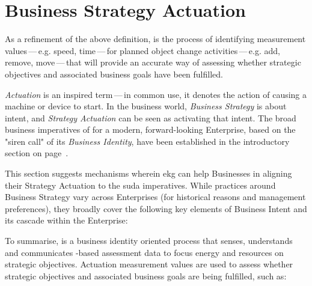 \chapter{Business Strategy Actuation}
\label{ch:ekg-mm-a-1}
\label{ch:ekg-mm-business-strategy-actuation}



As a refinement of the above definition, \textbf{} is the process of
identifying measurement values\,---\,e.g. speed, time\,---\,for planned object change activities\,---\,e.g.
add, remove, move\,---\,that will provide an accurate way of assessing whether strategic objectives and
associated business goals have been fulfilled.

\textit{Actuation} is an inspired term\,---\,in common use, it denotes the action of causing a
machine or device to start.
In the business world, \textit{Business Strategy} is about intent, and \textit{Strategy Actuation}
can be seen as activating that intent.
The broad business imperatives of  for a modern, forward-looking Enterprise,
based on the "siren call" of its \textit{Business Identity},
have been established in the introductory section on page~\pageref{sec:ekg-mm-business-identity}.

This section suggests mechanisms wherein \gls{ekg} can help Businesses in aligning their Strategy Actuation to
the \gls{suda} imperatives.
While practices around Business Strategy vary across Enterprises (for historical reasons and management preferences),
they broadly cover the following key elements of Business Intent and its cascade within the Enterprise:







To summarise, \textbf{} is a business identity oriented process
that senses, understands and communicates -based assessment data to focus energy and
resources on strategic objectives.
Actuation measurement values are used to assess whether strategic objectives and associated business goals are
being fulfilled, such as:

